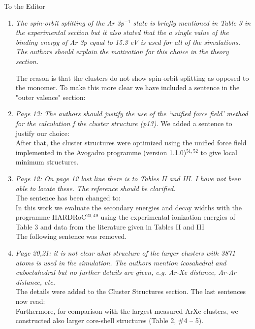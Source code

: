 \documentclass[DIN,pagenumber=false,parskip=half,fromalign=left,fromphone=true,fromemail=true,fromurl=false,fromlogo=false,fromrule=false]{scrlttr2}
\begin{document}
\begin{letter}{To the Editor}
\begin{enumerate}
 \item \emph{The spin-orbit splitting of the Ar 3p$^{-1}$ state is briefly mentioned in Table 3 in the experimental section but it also stated that the a single value of the binding energy of Ar 3p equal to 15.3 eV is used for all of the simulations. The authors should explain the motivation for this choice in the theory section.}

The reason is that the clusters do not show spin-orbit splitting as opposed to the monomer. To make this more clear we have included a sentence in the "outer valence" section: {}

 \item \emph{Page 13:
       The authors should justify the use of the ‘unified force field’ method for the calculation f the cluster structure (p13).}
       We added a sentence to justify our choice:\\
       After that, the cluster structures were optimized using the unified
       force field implemented in the Avogadro programme
       (version 1.1.0)$^{51,52}$ to give local minimum structures.
       {\color{blue}{ The method
       was chosen due to its low computational cost, the possibility to find
       the next local minimum structure based on the chosen starting point
       and the necessary effort to produce reliable results with density
       functional theory (DFT) for v. d. Waals interactions since we in
       this work discuss structural trends and not absolute structures.}}

 \item \emph{Page 12:
       On page 12 last line there is to Tables II and III. I have not been able to locate these. The reference should be clarified.}\\
       The sentence has been changed to:\\
       In this work we evaluate the secondary energies and decay widths with
       the programme HARDRoC$^{20,49}$ using the experimental ionization energies
       of Table 3 and data from the literature given in Tables II and III
       {\color{blue}{of Ref. 34.}}\\
       The following sentence was removed.

 \item \emph{Page 20,21:
       it is not clear what structure of the larger clusters with 3871 atoms is used in the simulation. The authors mention icosahedral and cuboctahedral but no further details are given, e.g. Ar-Xe distance, Ar-Ar distance, etc.}\\
       The details were added to the Cluster Structures section. The last
       sentences now read:\\
       Furthermore, for comparison with the largest measured ArXe clusters,
       we constructed also larger core-shell structures (Table 2, \#4 – 5).
       {}


\end{enumerate}
\end{letter}
\end{document}
